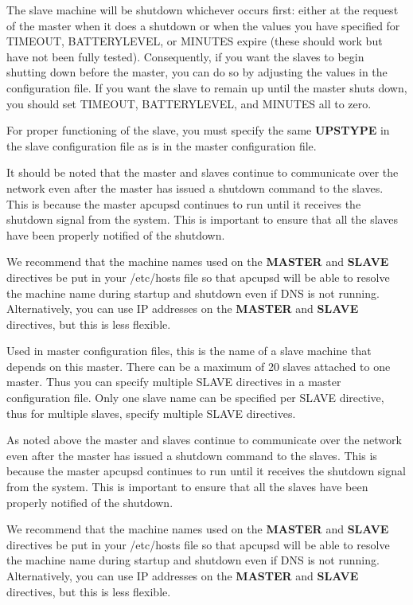 {{{{{{{{{{{{{{\begin{description}
{The slave machine will be shutdown whichever occurs first: either at the
request of the master when it does a shutdown or when the values you have
specified for TIMEOUT, BATTERYLEVEL, or MINUTES expire (these should work but
have not been fully tested). Consequently, if you want the slaves to begin
shutting down before the master, you can do so by adjusting the values in the
configuration file. If you want the slave to remain up until the master shuts
down, you should set TIMEOUT, BATTERYLEVEL, and MINUTES all to zero.  

For proper functioning of the slave, you must specify the same {\bf UPSTYPE}
in the slave configuration file as is in the master configuration file.  

It should be noted that the master and slaves continue to communicate over the
network even after the master has issued a shutdown command to the slaves.
This is because the master apcupsd continues to run until it receives the
shutdown signal from the system. This is important to ensure that all the
slaves have been properly notified of the shutdown.  

We recommend that the machine names used on the {\bf MASTER} and {\bf SLAVE}
directives be put in your /etc/hosts file so that apcupsd will be able to
resolve the machine name during startup and shutdown even if DNS is not
running. Alternatively, you can use IP addresses on the {\bf MASTER} and {\bf
SLAVE} directives, but this is less flexible.  

\item [SLAVE \lt{}name of slave(s)\gt{} used only in MASTER configuration
   files.]
Used in master configuration files, this is the name of a slave machine that
depends on this master. There can be a maximum of 20 slaves attached to one
master. Thus you can specify multiple SLAVE directives in a master
configuration file. Only one slave name can be specified per SLAVE directive,
thus for multiple slaves, specify multiple SLAVE directives.  

As noted above the master and slaves continue to communicate over the network
even after the master has issued a shutdown command to the slaves. This is
because the master apcupsd continues to run until it receives the shutdown
signal from the system. This is important to ensure that all the slaves have
been properly notified of the shutdown.  

We recommend that the machine names used on the {\bf MASTER} and {\bf SLAVE}
directives be put in your /etc/hosts file so that apcupsd will be able to
resolve the machine name during startup and shutdown even if DNS is not
running. Alternatively, you can use IP addresses on the {\bf MASTER} and {\bf
SLAVE} directives, but this is less flexible.  

}
\end{description}}}}}}}}}}}}}}}
